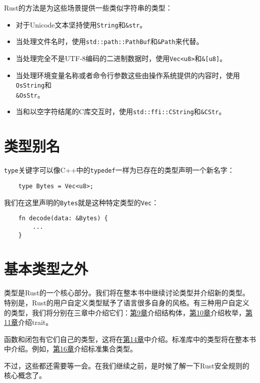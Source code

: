 Rust的方法是为这些场景提供一些类似字符串的类型：
\begin{itemize}
    \item 对于Unicode文本坚持使用\texttt{String}和\texttt{\&str}。
    \item 当处理文件名时，使用\texttt{std::path::PathBuf}和\texttt{\&Path}来代替。
    \item 当处理完全不是UTF-8编码的二进制数据时，使用\texttt{Vec<u8>}和\texttt{\&[u8]}。
    \item 当处理环境变量名称或者命令行参数这些由操作系统提供的内容时，使用\texttt{OsString}和\\\texttt{\&OsStr}。
    \item 当和以空字符结尾的C库交互时，使用\texttt{std::ffi::CString}和\texttt{\&CStr}。
\end{itemize}

\section{类型别名}

\texttt{type}关键字可以像C++中的\texttt{typedef}一样为已存在的类型声明一个新名字：
\begin{verbatim}
    type Bytes = Vec<u8>;
\end{verbatim}

我们在这里声明的\texttt{Bytes}就是这种特定类型的\texttt{Vec}：
\begin{verbatim}
    fn decode(data: &Bytes) {
        ...
    }
\end{verbatim}

\section{基本类型之外}

类型是Rust的一个核心部分。我们将在整本书中继续讨论类型并介绍新的类型。特别是，Rust的用户自定义类型赋予了语言很多自身的风格。有三种用户自定义的类型，我们将分别在三章中介绍它们：\hyperref[ch09]{第9章}介绍结构体，\hyperref[ch10]{第10章}介绍枚举，\hyperref[ch11]{第11章}介绍trait。

函数和闭包有它们自己的类型，这将在\hyperref[ch14]{第14章}中介绍。标准库中的类型将在整本书中介绍。例如，\hyperref[ch16]{第16章}介绍标准集合类型。

不过，这些都还需要等一会。在我们继续之前，是时候了解一下Rust安全规则的核心概念了。

